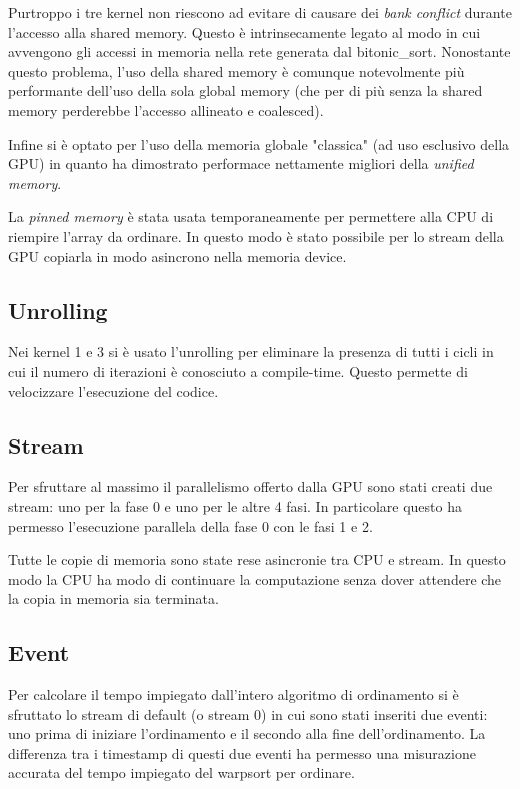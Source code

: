 \documentclass[a4paper, 11pt]{article}
\begin{document}
			Purtroppo i tre kernel non riescono ad evitare di causare dei \emph{bank conflict} durante l'accesso alla shared memory. 
			Questo è intrinsecamente legato al modo in cui avvengono gli accessi in memoria nella rete generata dal bitonic\_sort.
			Nonostante questo problema, l'uso della shared memory è comunque notevolmente più performante dell'uso della sola global memory 
			(che per di più senza la shared memory perderebbe l'accesso allineato e coalesced).  
		
			Infine si è optato per l'uso della memoria globale "classica" (ad uso esclusivo della GPU) in quanto ha dimostrato performace
			nettamente migliori della \emph{unified memory}.
			
			La \emph{pinned memory} è stata usata temporaneamente per permettere alla CPU di riempire l'array da ordinare. 
			In questo modo è stato possibile per lo stream della GPU copiarla in modo asincrono nella memoria device.
		\subsection{Unrolling}
			Nei kernel 1 e 3 si è usato l'unrolling per eliminare la presenza di tutti i cicli in cui il numero di iterazioni è conosciuto a
			compile-time. 
			Questo permette di velocizzare l'esecuzione del codice. 
			
		\subsection{Stream}
			Per sfruttare al massimo il parallelismo offerto dalla GPU sono stati creati due stream: 
			uno per la fase 0 e uno per le altre 4 fasi.			
			In particolare questo ha permesso l'esecuzione parallela della fase 0 con le fasi 1 e 2.
			
			Tutte le copie di memoria sono state rese asincronie tra CPU e stream. In questo modo la CPU ha modo di continuare la 
			computazione senza dover attendere che la copia in memoria sia terminata.			
			
		\subsection{Event}
			Per calcolare il tempo impiegato dall'intero algoritmo di ordinamento si è sfruttato lo stream di default (o stream 0)
			in cui sono stati inseriti due eventi: uno prima di iniziare l'ordinamento e il secondo alla fine dell'ordinamento.
			La differenza tra i timestamp di questi due eventi ha permesso una misurazione accurata del tempo impiegato del warpsort per ordinare.
\end{document}
